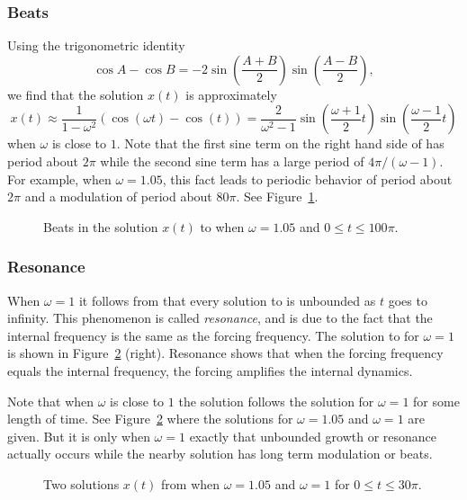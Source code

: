 \subsubsection*{Beats}

Using the trigonometric identity
\[
\cos A - \cos B = -2\sin\left(\frac{A+B}{2}\right)
\sin\left(\frac{A-B}{2}\right),
\]
we find that the solution $x(t)$ is approximately
\begin{equation}  \label{e:x(t)reson3}
x(t) \approx  \frac{1}{1-\omega^2} (\cos(\omega t)-\cos(t))=
\frac{2}{\omega ^2-1}
\sin\left(\frac{\omega+1}{2}t\right)\sin\left(\frac{\omega-1}{2}t\right)
\end{equation}
when $\omega$ is close to $1$.  Note that the first sine term on the right hand
side of  has period about $2\pi$ while the second sine term 
has a large period of $4\pi/(\omega-1)$.  For example, when $\omega=1.05$, this
fact leads to periodic behavior of period about $2\pi$ and a 
modulation 
of period about $80\pi$.  See Figure~\ref{F:beats}.
\begin{figure}[htb]
           \centerline{%
           }
           \caption{Beats in the solution $x(t)$ to  
		when $\omega =1.05$ and $0\leq t\leq 100\pi$.}
           \label{F:beats}
\end{figure}  

\subsubsection*{Resonance}

When $\omega = 1$ it follows from  that every
solution to  is unbounded as $t$ goes to infinity.  This
phenomenon is called {\em resonance\/}, and is due to the fact that the
internal frequency is the same as the 
forcing frequency.  The solution
to  for $\omega=1$ is shown in Figure~\ref{F:reson} (right).
Resonance shows that when the forcing frequency equals the internal 
frequency, the forcing amplifies the internal dynamics.

Note that when $\omega$ is close to $1$ the solution follows the solution 
for $\omega =1$ for some length of time.  See Figure~\ref{F:reson} where 
the solutions for $\omega =1.05$ and $\omega =1$ are given.  But it is only 
when $\omega =1$ exactly that unbounded growth or resonance actually occurs 
while the nearby solution has long term modulation or beats.
\begin{figure}[htb]
           \centerline{%
           }
           \caption{Two solutions $x(t)$ from  when
                $\omega =1.05$ and $\omega =1$ for $0\leq t\leq 30\pi$.}
           \label{F:reson}
\end{figure}  



